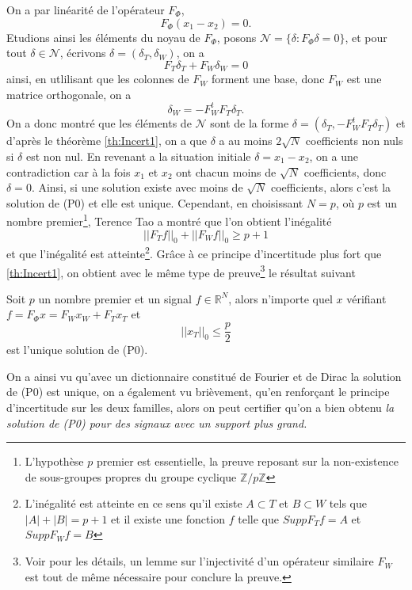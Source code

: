 \begin{exemple}
	On a par linéarité de l'opérateur $F_\Phi$, 
	\begin{equation}
		F_\Phi( x_1 - x_2) = 0.
	\end{equation}
	Etudions ainsi les éléments du noyau de $F_\Phi$, posons $\mathcal{N} = \{\delta : F_\Phi \delta = 0\}$, et pour tout $\delta \in \mathcal{N}$, écrivons $\delta = (\delta_T, \delta_W)$, on a
	\begin{equation}
		F_T \delta_T + F_W \delta_W = 0
	\end{equation}
	ainsi, en utlilisant que les colonnes de $F_W$ forment une base, donc $F_W$ est une matrice orthogonale, on a 
	\begin{equation}\label{eq:structN}
		\delta_W = -F_W^t F_T \delta_T .
	\end{equation}
	On a donc montré que les éléments de $\mathcal{N}$ sont de la forme $\delta = (\delta_T, -F_W^t F_T \delta_T)$ et d'après le théorème \ref{th:Incert1}, on a que $\delta$ a au moins $2\sqrt{N}$ coefficients non nuls si $\delta$ est non nul. 
	En revenant a la situation initiale $\delta = x_1 - x_2$, on a une contradiction car à la fois $x_1$ et $x_2$ ont chacun moins de $\sqrt{N}$ coefficients, donc $\delta = 0$.
	Ainsi, si une solution existe avec moins de $\sqrt{N}$ coefficients, alors c'est la solution de (P0) et elle est unique.
	\newline
	Cependant, en choisissant $N = p$, où $p$ est un nombre premier\footnote{L'hypothèse $p$ premier est essentielle, la preuve reposant sur la non-existence de sous-groupes propres du groupe cyclique $\mathbb{Z}/p\mathbb{Z}$}, Terence Tao \cite{taoprime} a montré que l'on obtient l'inégalité
	\begin{equation}
		||F_T f||_0 + ||F_W f||_0 \geq p + 1
	\end{equation}
	et que l'inégalité est atteinte\footnote{L'inégalité est atteinte en ce sens qu'il existe $A\subset T$ et $B\subset W$ tels que $|A| + |B| = p+1$ et il existe une fonction $f$ telle que $Supp F_T f = A$ et $Supp F_W f = B$}.
	Grâce à ce principe d'incertitude plus fort que \ref{th:Incert1}, on obtient avec le même type de preuve\footnote{Voir \cite{CRT} pour les détails, un lemme sur l'injectivité d'un opérateur similaire $F_W$ est tout de même nécessaire pour conclure la preuve.} le résultat suivant
	\begin{theoreme}
		Soit $p$ un nombre premier et un signal $f \in \mathbb{R}^N$, alors n'importe quel $x$ vérifiant $f = F_\Phi x = F_W x_W + F_T x_T$ et
		\begin{equation}\label{eq:Incert2}
		||x_T||_0 \leq \frac{p}{2}
		\end{equation}
		est l'unique solution de (P0).
	\end{theoreme}
	On a ainsi vu qu'avec un dictionnaire constitué de Fourier et de Dirac la solution de (P0) est unique, on a également vu brièvement, qu'en renforçant le principe d'incertitude sur les deux familles, alors on peut certifier qu'on a bien obtenu \it{la} solution de (P0) pour des signaux avec un support plus grand.
\end{exemple}

